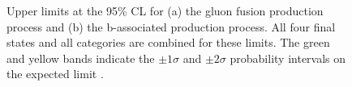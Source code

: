 \begin{figure}[h!]
\begin{center}
\end{center}
\caption[Upper limits at the 95\% CL for the gluon fusion and b-associated production process.]{Upper limits at the 95\% \ac{CL} for (a) the gluon fusion production
process and (b) the b-associated production process. All four final states and 
all categories are combined for these limits. The green and yellow bands indicate
the $\pm 1\sigma$ and $\pm 2\sigma$ probability intervals on the expected limit \cite{CMS-PAS-HIG-16-006}.}
\label{fig:mssm_results_hig16006_limits}
\end{figure}

